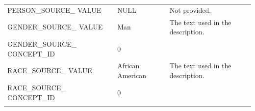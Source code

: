 \documentclass[11pt]{book}
\theoremstyle{definition}
\theoremstyle{definition}
\theoremstyle{definition}
\theoremstyle{remark}
\begin{document}
\begin{longtable}[]{@{}lll@{}}
\begin{minipage}[t]{0.28\columnwidth}
PERSON\_SOURCE\_ VALUE\strut
\end{minipage} & \begin{minipage}[t]{0.16\columnwidth}\raggedright\strut
NULL\strut
\end{minipage} & \begin{minipage}[t]{0.48\columnwidth}\raggedright\strut
Not provided.\strut
\end{minipage}\tabularnewline
\begin{minipage}[t]{0.28\columnwidth}\raggedright\strut
GENDER\_SOURCE\_ VALUE\strut
\end{minipage} & \begin{minipage}[t]{0.16\columnwidth}\raggedright\strut
Man\strut
\end{minipage} & \begin{minipage}[t]{0.48\columnwidth}\raggedright\strut
The text used in the description.\strut
\end{minipage}\tabularnewline
\begin{minipage}[t]{0.28\columnwidth}\raggedright\strut
GENDER\_SOURCE\_ CONCEPT\_ID\strut
\end{minipage} & \begin{minipage}[t]{0.16\columnwidth}\raggedright\strut
0\strut
\end{minipage} & \begin{minipage}[t]{0.48\columnwidth}\raggedright\strut
\strut
\end{minipage}\tabularnewline
\begin{minipage}[t]{0.28\columnwidth}\raggedright\strut
RACE\_SOURCE\_ VALUE\strut
\end{minipage} & \begin{minipage}[t]{0.16\columnwidth}\raggedright\strut
African American\strut
\end{minipage} & \begin{minipage}[t]{0.48\columnwidth}\raggedright\strut
The text used in the description.\strut
\end{minipage}\tabularnewline
\begin{minipage}[t]{0.28\columnwidth}\raggedright\strut
RACE\_SOURCE\_ CONCEPT\_ID\strut
\end{minipage} & \begin{minipage}[t]{0.16\columnwidth}\raggedright\strut
0\strut
\end{minipage} & \begin{minipage}[t]{0.48\columnwidth}\raggedright\strut
\strut
\end{minipage}\tabularnewline
\begin{minipage}[t]{0.28\columnwidth}\raggedright\strut

\end{minipage}
\end{longtable}
\end{document}
